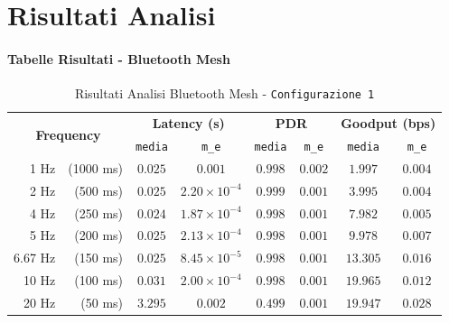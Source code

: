 \appendix

\chapter{Risultati Analisi}
\subsubsection{Tabelle Risultati - Bluetooth Mesh}
\label{apex:outcomes_ble_mesh}
\begin{table}[hbt!]
    \centering
    \begin{tabular}{ |rr|| c|c|c|c|c|c| } 
        \hline
        \multicolumn{2}{|c||}{\multirow{2}{*}{\textbf{Frequency}}} & \multicolumn{2}{|c|}{\textbf{Latency \scriptsize (s)}} & \multicolumn{2}{|c|}{\textbf{PDR}} & \multicolumn{2}{|c|}{\textbf{Goodput \scriptsize (bps)}} \\
        && \texttt{media} & \texttt{m\_e} & \texttt{media} & \texttt{m\_e} & \texttt{media} & \texttt{m\_e} \\

		\hline
		1 Hz & \scriptsize (1000 ms) & $ 0.025 $ & $ 0.001 $ & $ 0.998 $ & $ 0.002 $ & $ 1.997 $ & $ 0.004 $ \\
		\hline
		2 Hz & \scriptsize (500 ms) & $ 0.025 $ & $ 2.20 \times 10^{-4} $ & $ 0.999 $ & $ 0.001 $ & $ 3.995 $ & $ 0.004 $ \\
		\hline
		4 Hz & \scriptsize (250 ms) & $ 0.024 $ & $ 1.87 \times 10^{-4} $ & $ 0.998 $ & $ 0.001 $ & $ 7.982 $ & $ 0.005 $ \\
		\hline
		5 Hz & \scriptsize (200 ms) & $ 0.025 $ & $ 2.13 \times 10^{-4} $ & $ 0.998 $ & $ 0.001 $ & $ 9.978 $ & $ 0.007 $ \\
		\hline
		6.67 Hz & \scriptsize (150 ms) & $ 0.025 $ & $ 8.45 \times 10^{-5} $ & $ 0.998 $ & $ 0.001 $ & $ 13.305 $ & $ 0.016 $ \\
		\hline
		10 Hz & \scriptsize (100 ms) & $ 0.031 $ & $ 2.00 \times 10^{-4} $ & $ 0.998 $ & $ 0.001 $ & $ 19.965 $ & $ 0.012 $ \\
		\hline
		20 Hz & \scriptsize (50 ms) & $ 3.295 $ & $ 0.002 $ & $ 0.499 $ & $ 0.001 $ & $ 19.947 $ & $ 0.028 $ \\
		\hline
    \end{tabular}
    \caption{Risultati Analisi Bluetooth Mesh - \texttt{Configurazione 1}}
    \label{tab:table_ble_conf_1}
\end{table}

